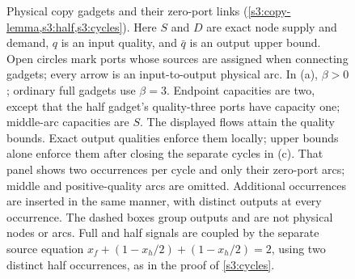 \begin{figure}[p]
\caption{Physical copy gadgets and their zero-port links
(\cref{s3:copy-lemma,s3:half,s3:cycles}). Here $S$ and $D$ are exact
node supply and demand, $q$ is an input quality, and $\bar q$ is an
output upper bound. Open circles mark ports whose sources are assigned
when connecting gadgets; every arrow is an input-to-output physical arc.
In (a), $\beta>0$; ordinary full gadgets use $\beta=3$.
Endpoint capacities are two, except that the half gadget's quality-three
ports have capacity one; middle-arc capacities are $S$.
The displayed flows attain the quality bounds. Exact output qualities
enforce them locally; upper bounds alone enforce them after closing the
separate cycles in (c). That panel shows two occurrences per cycle and
only their zero-port arcs; middle and positive-quality arcs are omitted.
Additional occurrences are inserted in the same manner, with distinct
outputs at every occurrence. The dashed boxes group outputs and are not
physical nodes or arcs. Full and half signals are coupled by the
separate source equation $x_f+(1-x_h/2)+(1-x_h/2)=2$, using two distinct
half occurrences, as in the proof of \cref{s3:cycles}.}
\label{s3:copy-figure}
\end{figure}
